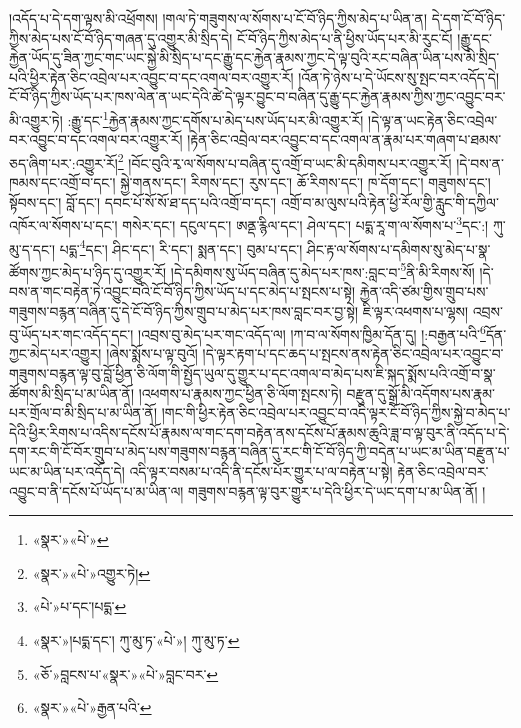 །འདོད་པ་དེ་དག་ལྟས་མི་འཕྲོགས། །གལ་ཏེ་གཟུགས་ལ་སོགས་པ་ངོ་བོ་ཉིད་ཀྱིས་མེད་པ་ཡིན་ན། དེ་དག་ངོ་བོ་ཉིད་ཀྱིས་མེད་པས་ངོ་བོ་ཉིད་གཞན་དུ་འགྱུར་མི་སྲིད་དེ། ངོ་བོ་ཉིད་ཀྱིས་མེད་པ་ནི་ཕྱིས་ཡོད་པར་མི་རུང་ངོ། །རྒྱུ་དང་རྐྱེན་ཡོད་དུ་ཟིན་ཀྱང་གང་ཡང་སྐྱེ་མི་སྲིད་པ་དང་རྒྱུ་དང་རྐྱེན་རྣམས་ཀྱང་དེ་ལྟ་བུའི་རང་བཞིན་ཡིན་པས་མི་སྲིད་པའི་ཕྱིར་རྟེན་ཅིང་འབྲེལ་པར་འབྱུང་བ་དང་འགལ་བར་འགྱུར་རོ། །འོན་ཏེ་ཉེས་པ་དེ་ཡོངས་སུ་སྤང་བར་འདོད་དེ། ངོ་བོ་ཉིད་ཀྱིས་ཡོད་པར་ཁས་ལེན་ན་ཡང་དེའི་ཚེ་དེ་ལྟར་བྱུང་བ་བཞིན་དུ་རྒྱུ་དང་རྐྱེན་རྣམས་ཀྱིས་ཀྱང་འབྱུང་བར་མི་འགྱུར་ཏེ། :རྒྱུ་དང་\footnote{«སྣར་»«པེ་»}རྐྱེན་རྣམས་ཀྱང་དགོས་པ་མེད་པས་ཡོད་པར་མི་འགྱུར་རོ། །དེ་ལྟ་ན་ཡང་རྟེན་ཅིང་འབྲེལ་བར་འབྱུང་བ་དང་འགལ་བར་འགྱུར་རོ། །རྟེན་ཅིང་འབྲེལ་བར་འབྱུང་བ་དང་འགལ་ན་རྣམ་པར་གཞག་པ་ཐམས་ཅད་ཞིག་པར་:འགྱུར་རོ།\footnote{«སྣར་»«པེ་»འགྱུར་ཏེ།} །བོང་བུའི་རྭ་ལ་སོགས་པ་བཞིན་དུ་འགྲོ་བ་ཡང་མི་དམིགས་པར་འགྱུར་རོ། །དེ་བས་ན་ཁམས་དང་འགྲོ་བ་དང་། སྐྱེ་གནས་དང་། རིགས་དང་། རུས་དང་། ཆོ་རིགས་དང་། ཁ་དོག་དང་། གཟུགས་དང་། སྟོབས་དང་། བློ་དང་། དབང་པོ་སོ་སོ་ཐ་དད་པའི་འགྲོ་བ་དང་། འགྲོ་བ་མ་ལུས་པའི་རྟེན་ཕྱི་རོལ་གྱི་རླུང་གི་དཀྱིལ་འཁོར་ལ་སོགས་པ་དང་། གསེར་དང་། དངུལ་དང་། ཨནྡ་རྙིལ་དང་། ཤེལ་དང་། པདྨ་རཱ་ག་ལ་སོགས་པ་\footnote{«པེ་»པ་དང་།པདྨ་}དང་:། ཀུ་མུ་ད་དང་། པདྨ་\footnote{«སྣར་»།པདྨ་དང་། ཀུ་མུ་ཏ་«པེ་»། ཀུ་མུ་ཏ་}དང་། ཤིང་དང་། རི་དང་། སྨན་དང་། བུམ་པ་དང་། ཤིང་རྟ་ལ་སོགས་པ་དམིགས་སུ་མེད་པ་སྣ་ཚོགས་ཀྱང་མེད་པ་ཉིད་དུ་འགྱུར་རོ། །དེ་དམིགས་སུ་ཡོད་བཞིན་དུ་མེད་པར་ཁས་:བླང་བ་\footnote{«ཅོ་»བླངས་པ་«སྣར་»«པེ་»བླང་བར་}ནི་མི་རིགས་སོ། །དེ་བས་ན་གང་བརྟེན་ཏེ་འབྱུང་བའི་ངོ་བོ་ཉིད་ཀྱིས་ཡོད་པ་དང་མེད་པ་སྤངས་པ་སྟེ། རྐྱེན་འདི་ཙམ་གྱིས་གྲུབ་པས་གཟུགས་བརྙན་བཞིན་དུ་དེ་ངོ་བོ་ཉིད་ཀྱིས་གྲུབ་པ་མེད་པར་ཁས་བླང་བར་བྱ་སྟེ། ཇི་ལྟར་འཕགས་པ་ལྷས། འབྲས་བུ་ཡོད་པར་གང་འདོད་དང་། །འབྲས་བུ་མེད་པར་གང་འདོད་ལ། །ཀ་བ་ལ་སོགས་ཁྱིམ་དོན་དུ། །:བརྒྱན་པའི་\footnote{«སྣར་»«པེ་»རྒྱན་པའི་}དོན་ཀྱང་མེད་པར་འགྱུར། །ཞེས་སྨོས་པ་ལྟ་བུའོ། །དེ་ལྟར་རྟག་པ་དང་ཆད་པ་སྤངས་ནས་རྟེན་ཅིང་འབྲེལ་པར་འབྱུང་བ་གཟུགས་བརྙན་ལྟ་བུ་བློ་ཕྱིན་ཅི་ལོག་གི་སྤྱོད་ཡུལ་དུ་གྱུར་པ་དང་འགལ་བ་མེད་པས་ཇི་སྐད་སྨོས་པའི་འགྲོ་བ་སྣ་ཚོགས་མི་སྲིད་པ་མ་ཡིན་ནོ། །འཕགས་པ་རྣམས་ཀྱང་ཕྱིན་ཅི་ལོག་སྤངས་ཏེ། བརྫུན་དུ་སྒྲོ་མི་འདོགས་པས་རྣམ་པར་གྲོལ་བ་མི་སྲིད་པ་མ་ཡིན་ནོ། །གང་གི་ཕྱིར་རྟེན་ཅིང་འབྲེལ་པར་འབྱུང་བ་འདི་ལྟར་ངོ་བོ་ཉིད་ཀྱིས་སྐྱེ་བ་མེད་པ་དེའི་ཕྱིར་རིགས་པ་འདིས་དངོས་པོ་རྣམས་ལ་གང་དག་བརྟེན་ནས་དངོས་པོ་རྣམས་ཆུའི་ཟླ་བ་ལྟ་བུར་ནི་འདོད་པ་དེ་དག་རང་གི་ངོ་བོར་གྲུབ་པ་མེད་པས་གཟུགས་བརྙན་བཞིན་དུ་རང་གི་ངོ་བོ་ཉིད་ཀྱི་བདེན་པ་ཡང་མ་ཡིན་བརྫུན་པ་ཡང་མ་ཡིན་པར་འདོད་དེ། འདི་ལྟར་བསམ་པ་འདི་ནི་དངོས་པོར་གྱུར་པ་ལ་བརྟེན་པ་སྟེ། རྟེན་ཅིང་འབྲེལ་བར་འབྱུང་བ་ནི་དངོས་པོ་ཡོད་པ་མ་ཡིན་ལ། གཟུགས་བརྙན་ལྟ་བུར་གྱུར་པ་དེའི་ཕྱིར་དེ་ཡང་དག་པ་མ་ཡིན་ནོ། །
